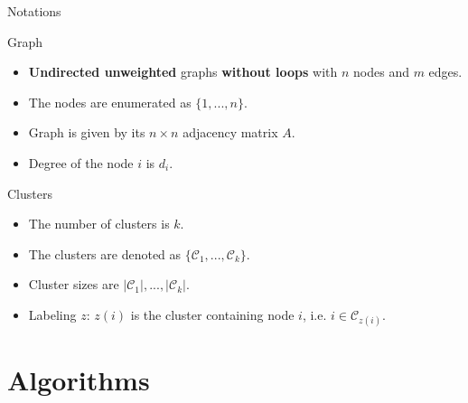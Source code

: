 \documentclass{beamer}
\theoremstyle{definition}
\theoremstyle{plain}
\theoremstyle{remark}
\begin{document}
			\begin{frame}{Notations}

			\vspace{-5pt}
			\begin{block}{Graph}
				\begin{itemize}
					\item \textbf{Undirected unweighted} graphs \textbf{without loops} with $n$ nodes and $m$ edges.
					\item The nodes are enumerated as $\{ 1, ..., n\}$.\\
					\item Graph is given by its $n \times n $ adjacency matrix $A$.
					\item Degree of the node $i$ is $d_i$. 
				\end{itemize}

			\end{block}

			\vspace{-5pt}
			\begin{block}{Clusters}
				\begin{itemize}
				\item The number of clusters is $k$.\\
				\item The clusters are denoted as $\{ \mathcal{C}_1, ..., \mathcal{C}_k\}$.
				\item Cluster sizes are $ |\mathcal{C}_1|, ..., |\mathcal{C}_k|$.
				\item Labeling $z$: $z(i)$ is the cluster containing node $i$, i.e. $i \in \mathcal{C}_{z(i)}$.
				\end{itemize}
			\end{block}
		\end{frame}

	\section{Algorithms}
\end{document}
